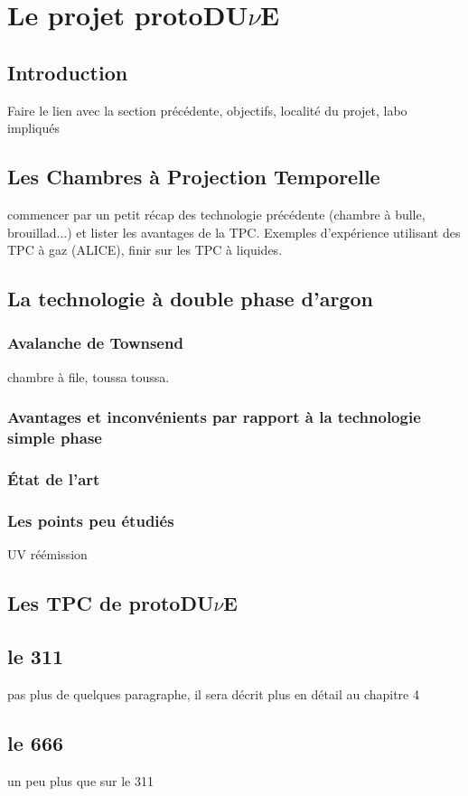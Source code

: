     \section{Le projet \texorpdfstring{protoDU$\nu$E}{protoDUNE}}
    
        \subsection{Introduction}
            Faire le lien avec la section précédente, objectifs, localité du projet, labo impliqués
    
        \subsection{Les Chambres à Projection Temporelle}
            commencer par un petit récap des technologie précédente (chambre à bulle, brouillad...) et lister les avantages de la TPC. Exemples d'expérience utilisant des TPC à gaz (ALICE), finir sur les TPC à liquides.
        
        \subsection{La technologie à double phase d'argon}
            \subsubsection{Avalanche de Townsend}
                chambre à file, toussa toussa.
            \subsubsection{Avantages et inconvénients par rapport à la technologie simple phase}\label{sec::townsend_avalanche}
            \subsubsection{État de l'art}
            \subsubsection{Les points peu étudiés}
                UV réémission
        
        \subsection{Les TPC de \texorpdfstring{protoDU$\nu$E}{protoDUNE}}
            \subsection{le 311}
                pas plus de quelques paragraphe, il sera décrit plus en détail au chapitre 4
            \subsection{le 666}
                un peu plus que sur le 311
